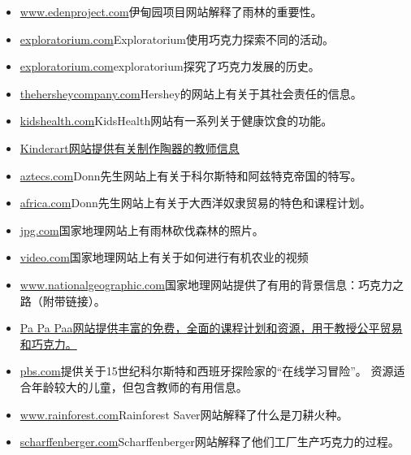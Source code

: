 \begin{itemize}
  \item \href{https://www.edenproject.com/rainforest/}{www.edenproject.com}伊甸园项目网站解释了雨林的重要性。
  \item \href{http://www.exploratorium.edu/exploring/exploring_chocolate/choc_2.html}{exploratorium.com}Exploratorium使用巧克力探索不同的活动。
  \item \href{http://www.exploratorium.edu/exploring/exploring_chocolate/choc_2.html}{exploratorium.com}exploratorium探究了巧克力发展的历史。
  \item \href{https://www.thehersheycompany.com/social-responsibility.aspx}{thehersheycompany.com}Hershey的网站上有关于其社会责任的信息。
  \item \href{http://http//kidshealth.org/kid/stay_healthy/index.html#cat119}{kidshealth.com}KidsHealth网站有一系列关于健康饮食的功能。
  \item \href{http://www.kinderart.com/sculpture/clay.shtml}{Kinderart网站提供有关制作陶器的教师信息}
  \item \href{https://aztecs.mrdonn.org/spanish-arrival.html}{aztecs.com}Donn先生网站上有关于科尔斯特和阿兹特克帝国的特写。
  \item \href{https://africa.mrdonn.org/slavetrade.html}{africa.com}Donn先生网站上有关于大西洋奴隶贸易的特色和课程计划。
  \item \href{http://environment.nationalgeographic.com/environment/photos/rainforest- deforestation//#/madagascar-slash-burn_278_600x450.jpg}{jpg.com}国家地理网站上有雨林砍伐森林的照片。
  \item \href{http://video.nationalgeographic.com/video/player/news/environment-\%20news/domrep-cacao-wcvin.html}{video.com}国家地理网站上有关于如何进行有机农业的视频
  \item \href{https://www.nationalgeographic.com/magazine/}{www.nationalgeographic.com}国家地理网站提供了有用的背景信息：巧克力之路（附带链接）。
  \item \href{http://www.papapaa.org}{Pa Pa Paa网站提供丰富的免费，全面的课程计划和资源，用于教授公平贸易和巧克力。}
  \item \href{http://www.pbs.org/program/retired-site/}{pbs.com}提供关于15世纪科尔斯特和西班牙探险家的“在线学习冒险”。 资源适合年龄较大的儿童，但包含教师的有用信息。
  \item \href{http://www.rainforestsaver.org/what-slash-and-burn-farming}{www.rainforest.com}Rainforest Saver网站解释了什么是刀耕火种。
  \item \href{http://www.scharffenberger.com/our-story/artisan-process/}{scharffenberger.com}Scharffenberger网站解释了他们工厂生产巧克力的过程。

\end{itemize}
